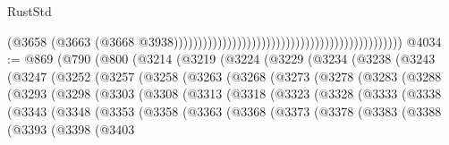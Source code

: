 \begin{lexlean}{RustStd}
\begin{coremodule}
                                                                                            (@3658
                                                                                              (@3663
                                                                                                (@3668
                                                                                                  @3938)))))))))))))))))))))))))))))))))))))))))))))))
@4034 := @869
    (@790
      (@800
        (@3214
          (@3219
            (@3224
              (@3229
                (@3234
                  (@3238
                    (@3243
                      (@3247
                        (@3252
                          (@3257
                            (@3258
                              (@3263
                                (@3268
                                  (@3273
                                    (@3278
                                      (@3283
                                        (@3288
                                          (@3293
                                            (@3298
                                              (@3303
                                                (@3308
                                                  (@3313
                                                    (@3318
                                                      (@3323
                                                        (@3328
                                                          (@3333
                                                            (@3338
                                                              (@3343
                                                                (@3348
                                                                  (@3353
                                                                    (@3358
                                                                      (@3363
                                                                        (@3368
                                                                          (@3373
                                                                            (@3378
                                                                              (@3383
                                                                                (@3388
                                                                                  (@3393
                                                                                    (@3398
                                                                                      (@3403

\end{coremodule}
\end{lexlean}
